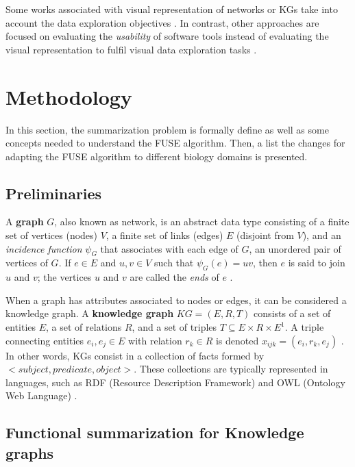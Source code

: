\documentclass{ieeeaccess}
\begin{document}
Some works associated with visual representation of networks or KGs
take into account the data exploration objectives \cite{ARCHAMBAULT20131044, 8801911}.
In contrast, other approaches are focused on evaluating the \textit{usability} of software
tools instead of evaluating the visual representation to fulfil visual data exploration
tasks \cite{UsabilityMeasurement2006, ISO9241112018, Camarillo20}. 

\section{Methodology}
\label{sec:Method}

In this section, the summarization problem is formally define as well as
some concepts needed to understand the FUSE algorithm. Then, a list the 
changes for adapting the FUSE algorithm to different biology domains is 
presented.

\subsection{Preliminaries}

A \textbf{graph} $G$, also known as network, is an abstract data type consisting
of a finite set of vertices (nodes) $V$, a finite set of links (edges) $E$ (disjoint
from $V$), and an \textit{incidence function} $\psi_{G}$ that associates with each
edge of $G$, an unordered pair of vertices of $G$. If $e \in E$ and $u, v \in V$ such that 
$\psi_{G}(e) =  uv$, then $e$ is said to join $u$ and $v$; the vertices $u$ and $v$ are
called the \textit{ends} of $e$ \cite{bondy1976graph}.

When a graph has attributes associated to nodes or edges, it can be
considered a knowledge graph. A \textbf{knowledge graph}
$KG=(E,R,T)$ consists of a set of entities $E$, a set of relations 
$R$, and a set of triples $T \subseteq E \times R \times E^{1}$. A
triple connecting entities $e_{i},e_{j} \in E$ with relation $r_{k} 
\in R$ is denoted $x_{ijk} = (e_{i},r_{k},e_{j})$ \cite{Koutra2019}. 
In other words, KGs consist in a collection of facts formed 
by $<subject,predicate,object>$. These collections are typically
represented in languages, such as RDF (Resource Description
Framework) \cite{RDF} and OWL (Ontology Web Language) \cite{OWL}.

\subsection{Functional summarization for Knowledge graphs}
\end{document}
